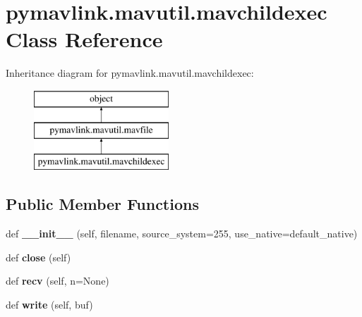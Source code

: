 \hypertarget{classpymavlink_1_1mavutil_1_1mavchildexec}{}\section{pymavlink.\+mavutil.\+mavchildexec Class Reference}
\label{classpymavlink_1_1mavutil_1_1mavchildexec}
Inheritance diagram for pymavlink.\+mavutil.\+mavchildexec\+:\begin{figure}[H]
\begin{center}
\leavevmode
\includegraphics[height=3.000000cm]{classpymavlink_1_1mavutil_1_1mavchildexec}
\end{center}
\end{figure}
\subsection*{Public Member Functions}
\begin{DoxyCompactItemize}
\item 
\mbox{\label{classpymavlink_1_1mavutil_1_1mavchildexec_ae515de22c566b5a5d8c293938bb79936}} 
def {\bfseries \+\_\+\+\_\+init\+\_\+\+\_\+} (self, filename, source\+\_\+system=255, use\+\_\+native=default\+\_\+native)
\item 
\mbox{\label{classpymavlink_1_1mavutil_1_1mavchildexec_ae42ec30dccc050e0b632847b4d47934a}} 
def {\bfseries close} (self)
\item 
\mbox{\label{classpymavlink_1_1mavutil_1_1mavchildexec_a82bdf3a8047fb35d535a82fd85761a52}} 
def {\bfseries recv} (self, n=None)
\item 
\mbox{\label{classpymavlink_1_1mavutil_1_1mavchildexec_af5ffc52892313980ff86884f05b3741a}} 
def {\bfseries write} (self, buf)
\end{DoxyCompactItemize}
